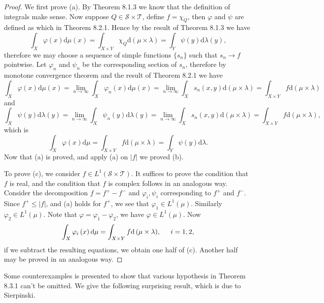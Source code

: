 \begin{proof}
We first prove (a). By Theorem 8.1.3 we know that the definition of integrals make sense. Now suppose $Q\in\mathscr{S}\times\mathscr{T}$, define $f=\chi_Q$, then $\varphi$ and $\psi$ are defined as which in Theorem 8.2.1. Hence by the result of Theorem 8.1.3 we have 
$$
\int_X{\varphi \left( x \right) \mathrm{d}\mu \left( x \right)}=\int_{X\times Y}{\chi _Q\mathrm{d}\left( \mu \times \lambda \right)}=\int_Y{\psi \left( y \right) \mathrm{d}\lambda \left( y \right)},
$$
therefore we may choose a sequence of simple functions $\{s_n\}$ such that $s_n\to f$ pointwise. Let $\varphi_n$ and $\psi_n$ be the corresponding section of $s_n$, therefore by monotone convergence theorem and the result of Theorem 8.2.1 we have 
$$
\int_X{\varphi \left( x \right) \mathrm{d}\mu \left( x \right)}=\lim_{n\rightarrow \infty} \int_X{\varphi _n\left( x \right) \mathrm{d}\mu \left( x \right)}=\lim_{n\rightarrow \infty} \int_X{s_n\left( x,y \right) \mathrm{d}\left( \mu \times \lambda \right)}=\int_{X\times Y}{f\mathrm{d}\left( \mu \times \lambda \right)}
$$
and 
$$
\int_X{\psi \left( y \right) \mathrm{d}\lambda \left( y \right)}=\lim_{n\rightarrow \infty} \int_X{\psi _n\left( y \right) \mathrm{d}\lambda \left( y \right)}=\lim_{n\rightarrow \infty} \int_X{s_n\left( x,y \right) \mathrm{d}\left( \mu \times \lambda \right)}=\int_{X\times Y}{f\mathrm{d}\left( \mu \times \lambda \right)},
$$
which is 
$$
\int_X{\varphi \left( x \right) \mathrm{d}\mu}=\int_{X\times Y}{f\mathrm{d}\left( \mu \times \lambda \right)}=\int_Y{\psi \left( y \right) \mathrm{d}\lambda}.
$$
Now that (a) is proved, and apply (a) on $|f|$ we proved (b).\par
To prove (c), we consider $f\in L^1(\mathscr{S}\times\mathscr{T})$. It suffices to prove the condition that $f$ is real, and the condition that $f$ is complex follows in an analogous way. Consider the decomposition $f=f^+-f^-$ and $\varphi_i,\psi_i$ corresponding to $f^+$ and $f^-$. Since $f^+\le|f|$, and (a) holds for $f^+$, we see that $\varphi_1\in L^1(\mu)$. Similarly $\varphi_2\in L^1(\mu)$. Note that $\varphi=\varphi_1-\varphi_2$, we have $\varphi\in L^1(\mu)$. Now 
$$
\int_X{\varphi _i\left( x \right) \mathrm{d}\mu}=\int_{X\times Y}{f\mathrm{d}\left( \mu \times \lambda \right)},\hspace{0.5cm}i=1,2,
$$
if we subtract the resulting equations, we obtain one half of (c). Another half may be proved in an analogous way.
\end{proof}
Some counterexamples is presented to show that various hypothesis in Theorem 8.3.1 can't be omitted. We give the following surprising result, which is due to Sierpinski.\par
